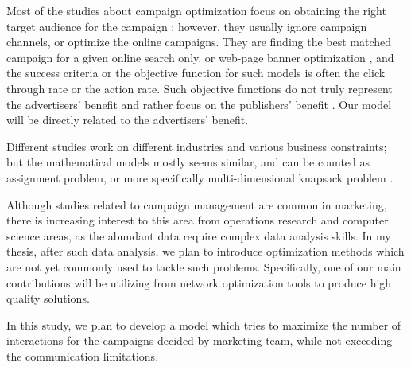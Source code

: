 \documentclass[11pt]{article}
\begin{document}
Most of the studies about campaign optimization focus on obtaining the right target audience for the campaign \citep{goul}; however, they usually ignore campaign channels, or optimize the online campaigns. They are finding the best matched campaign for a given online search only, or web-page banner optimization \citep{liu}, and the success criteria or the objective function for such models is often the click through rate or the action rate. Such objective functions do not truly represent the advertisers’ benefit and rather focus on the publishers’ benefit \citep{altshuler}. Our model will be directly related to the advertisers’ benefit.

Different studies work on different industries and various business constraints; but the mathematical models mostly seems similar, and can be counted as assignment problem, or more specifically multi-dimensional knapsack problem \citep{cohen_exp, oliveira_hypr}. 

Although studies related to campaign management are common in marketing, there is increasing interest to this area from operations research and computer science areas, as the abundant data require complex data analysis skills. In my thesis, after such data analysis, we plan to introduce optimization methods which are not yet commonly used to tackle such problems. Specifically, one of our main contributions will be utilizing from network optimization tools to produce high quality solutions. 

In this study, we plan to develop a model which tries to maximize the number of interactions for the campaigns decided by marketing team, while not exceeding the communication limitations.%
\end{document}
